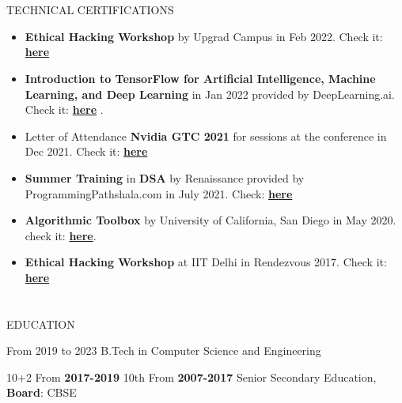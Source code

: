 \documentclass{my_cv}
\begin{document}
\begin{multicols}{2}
\section{\faPaintBrush}{TECHNICAL CERTIFICATIONS}
\begin{itemize}[noitemsep]
    \item \textbf{Ethical Hacking Workshop} by Upgrad Campus in Feb 2022. Check it: \textbf{\href{https://www.credential.net/90177f72-2c1d-4c6c-a2c1-5f0fab5d1319}{here}}
    \item \textbf{Introduction to TensorFlow for Artificial Intelligence, Machine Learning, and Deep Learning} in Jan 2022 provided by DeepLearning.ai. Check it: \textbf{\href{https://www.coursera.org/account/accomplishments/certificate/H8WRJYD4T2BQ}{here}} .
    \par
    \item Letter of Attendance\textbf{ Nvidia GTC 2021} for sessions at the conference in Dec 2021.
    Check it: \textbf{\href{https://drive.google.com/file/d/16Tgme1Sr4KLjh2kWmrEXJBxSxgiaxqPo/view}{here}}
    \par
    \item \textbf{Summer Training} in \textbf{DSA} by Renaissance provided by ProgrammingPathshala.com in July 2021. Check: \textbf{\href{https://drive.google.com/file/d/1mEDQhzi45hriBOnNocF9JVuJe5caTsaX/view}{here}}
    \par
    \item \textbf{Algorithmic Toolbox} by University of California, San Diego in May 2020. check it: \textbf{\href{https://www.coursera.org/account/accomplishments/certificate/7TUG86DARH68}{here}}.
    \par
    \item \textbf{Ethical Hacking Workshop} at IIT Delhi in Rendezvous 2017. Check it: \textbf{\href{https://drive.google.com/file/d/1I0uNqQeMgE7rf2xn4YXI0yu-UilRbEui/view}{here}}
   
\end{itemize}

\section{\faGraduationCap}{EDUCATION}
    
{From 2019 to 2023} %
{B.Tech in Computer Science and Engineering}
    
{ 10+2  From \textbf{ 2017-2019 } \newline 10th From \textbf{ 2007-2017 }} 
{Senior Secondary Education, \textbf{Board}: CBSE }


\end{multicols}
\end{document}
